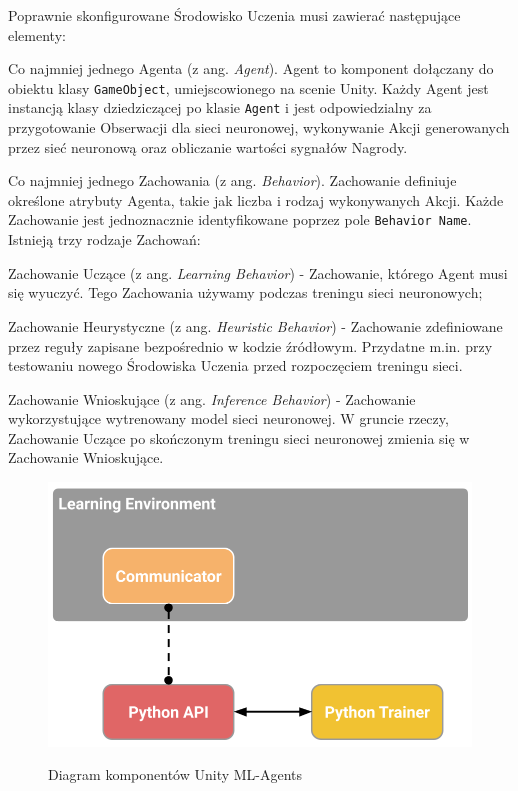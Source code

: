 Poprawnie skonfigurowane Środowisko Uczenia musi zawierać następujące elementy:
\begin{enumerate*}
\item Co najmniej jednego Agenta (z ang. \textit{Agent}). Agent to komponent dołączany do obiektu klasy \texttt{GameObject}, umiejscowionego na scenie Unity. Każdy Agent jest instancją klasy dziedziczącej po klasie \texttt{Agent} i jest odpowiedzialny za przygotowanie Obserwacji dla sieci neuronowej, wykonywanie Akcji generowanych przez sieć neuronową oraz obliczanie wartości sygnałów Nagrody.
\item Co najmniej jednego Zachowania (z ang. \textit{Behavior}). Zachowanie definiuje określone atrybuty Agenta, takie jak liczba i rodzaj wykonywanych Akcji. Każde Zachowanie jest jednoznacznie identyfikowane poprzez pole \texttt{Behavior Name}. \\
Istnieją trzy rodzaje Zachowań:
\begin{itemize*}
\item Zachowanie Uczące (z ang. \textit{Learning Behavior}) - Zachowanie, którego Agent musi się wyuczyć. Tego Zachowania używamy podczas treningu sieci neuronowych;
\item Zachowanie Heurystyczne (z ang. \textit{Heuristic Behavior}) - Zachowanie zdefiniowane przez reguły zapisane bezpośrednio w kodzie źródłowym. Przydatne m.in. przy testowaniu nowego Środowiska Uczenia przed rozpoczęciem treningu sieci.
\item Zachowanie Wnioskujące (z ang. \textit{Inference Behavior}) - Zachowanie wykorzystujące wytrenowany model sieci neuronowej. W gruncie rzeczy, Zachowanie Uczące po skończonym treningu sieci neuronowej zmienia się w Zachowanie Wnioskujące.
\end{itemize*}
\end{enumerate*}

\begin{figure}[h]
\begin{center}
\includegraphics[width=15cm]{resources/figures/learning_environment_basic.png}
\caption{Diagram komponentów Unity ML-Agents}
\label{UnityMlaComponents}
\end{center}
\end{figure}

